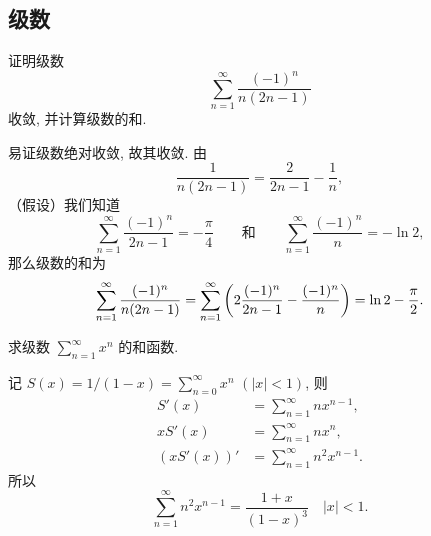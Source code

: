 \subsection{级数}

\begin{exercise}
    证明级数
    \[
    \sum_{n = 1}^\infty \frac{(-1)^n}{n(2n - 1)}
    \]
    收敛, 并计算级数的和. 
\end{exercise}

\begin{solution}
    易证级数绝对收敛, 故其收敛. 由
    \[
    \frac{1}{n(2n - 1)} = \frac{2}{2n - 1} - \frac{1}{n},
    \]
    （假设）我们知道
    \begin{equation*}
    \sum_{n = 1}^\infty \frac{(-1)^n}{2n - 1} = -\frac{\pi}{4}
    \qquad\text{和}\qquad
    \sum_{n = 1}^\infty \frac{(-1)^n}{n} = -\ln 2,
    \end{equation*}
    那么级数的和为
    \[
    \sum_{n = 1}^\infty \frac{(-1)^n}{n(2n - 1)} 
    = \sum_{n = 1}^\infty \del[3]{2\frac{(-1)^n}{2n - 1} - \frac{(-1)^n}{n}}
    = \ln 2 - \frac{\pi}{2}.
    \]
\end{solution}

\begin{exercise}
    求级数 $\sum_{n = 1}^\infty x^n$ 的和函数.
\end{exercise}

\begin{solution}
    记 $S(x) = 1 / (1 - x) = \sum_{n = 0}^\infty x^n$ $( \lvert x \rvert < 1)$, 则
    \begin{align*}
    S'(x) &= \sum_{n = 1}^\infty n x^{n - 1}, \\
    x S'(x) &= \sum_{n = 1}^\infty n x^n, \\
    (x S'(x))' &= \sum_{n = 1}^\infty n^2 x^{n - 1}.
    \end{align*}
    所以
    \[
    \sum_{n = 1}^\infty n^2 x^{n - 1} 
    = \frac{1 + x}{(1 - x)^3} \quad \lvert x \rvert < 1.
    \]
\end{solution}


